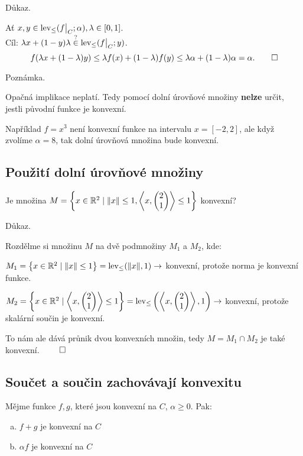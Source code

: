 Důkaz.

Ať $x, y \in \lev_{\leq}(\restr{f}{C}; \alpha), \lambda \in [0,1]$.\\
Cíl: $\lambda x + (1-y)\lambda \stackrel{?}{\in} \lev_{\leq} (\restr{f}{C}; y)$.
\[
    f(\lambda x + (1-\lambda)y) \leq \lambda f(x) + (1-\lambda) f(y) \leq \lambda \alpha + (1-\lambda) \alpha = \alpha. \qed
\]

Poznámka.

Opačná implikace neplatí. Tedy pomocí dolní úrovňové množiny \textbf{nelze} určit, jestli původní funkce je konvexní.

Například $f = x^3$ není konvexní funkce na intervalu $x = [-2, 2]$, ale když zvolíme $\alpha = 8$, tak dolní úrovňová 
množina bude konvexní. %

\subsection{Použití dolní úrovňové množiny}
Je množina $M = \left\lbrace x \in \mathbb{R}^2 \mid \| x\| \leq 1, \left\langle x, 
\begin{pmatrix}
    2 \\
    1
\end{pmatrix}
\right\rangle \leq 1 \right\rbrace$ konvexní?

Důkaz.

Rozdělme si množinu $M$ na dvě podmnožiny $M_1$ a $M_2$, kde:

$M_1 = \left\lbrace x \in \mathbb{R}^2 \mid \| x\| \leq 1 \right\rbrace = \operatorname{lev}_{\leq} (\| x\|, 1) \rightarrow$ konvexní, protože norma je konvexní funkce.

$M_2 = \left\lbrace x \in \mathbb{R}^2 \mid \left\langle x, 
\begin{pmatrix}
    2 \\
    1
\end{pmatrix}
\right\rangle \leq 1 \right\rbrace = \operatorname{lev}_{\leq} \left(\left\langle x, 
\begin{pmatrix}
    2 \\
    1
\end{pmatrix}
\right\rangle, 1\right) \rightarrow$ konvexní, protože skalární součin je konvexní.

To nám ale dává průnik dvou konvexních množin, tedy $M = M_1 \cap M_2$ je také konvexní. $\qed$


\subsection{Součet a součin zachovávají konvexitu}\label{ssKonv}
Mějme funkce $f, g$, které jsou konvexní na $C$, $\alpha \geq 0$. Pak:
\begin{enumerate}[(a)]
    \item $f+g$ je konvexní na $C$
    \item $\alpha f$ je konvexní na $C$
\end{enumerate}

